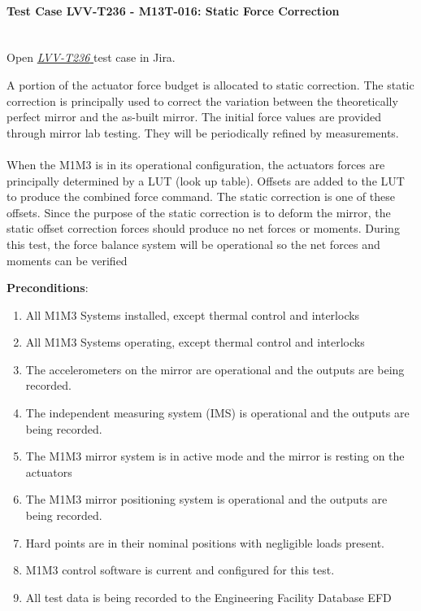 \documentclass[SE,lsstdraft,STR,toc]{lsstdoc}
\providecommand{\tightlist}{
  \setlength{\itemsep}{0pt}\setlength{\parskip}{0pt}}
\begin{document}
\paragraph{Test Case LVV-T236 - M13T-016: Static Force Correction }\mbox{}\\

Open  \href{https://jira.lsstcorp.org/secure/Tests.jspa#/testCase/LVV-T236}{\textit{ LVV-T236 } }
test case in Jira.

A portion of the actuator force budget is allocated to static
correction. The static correction is principally used to correct the
variation between the theoretically perfect mirror and the as-built
mirror. The initial force values are provided through mirror lab
testing. They will be periodically refined by measurements.\\
\hspace*{0.333em}\\
When the M1M3 is in its operational configuration, the actuators forces
are principally determined by a LUT (look up table). Offsets are added
to the LUT to produce the combined force command. The static correction
is one of these offsets. Since the purpose of the static correction is
to deform the mirror, the static offset correction forces should produce
no net forces or moments. During this test, the force balance system
will be operational so the net forces and moments can be verified

\textbf{ Preconditions}:\\
\begin{enumerate}
\tightlist
\item
  All M1M3 Systems installed, except thermal control and interlocks
\item
  All M1M3 Systems operating, except thermal control and interlocks
\item
  The accelerometers on the mirror are operational and the outputs are
  being recorded.
\item
  The independent measuring system (IMS) is operational and the outputs
  are being recorded.
\item
  The M1M3 mirror system is in active mode and the mirror is resting on
  the actuators
\item
  The M1M3 mirror positioning system is operational and the outputs are
  being recorded.
\item
  Hard points are in their nominal positions with negligible loads
  present.
\item
  M1M3 control software is current and configured for this test.
\item
  All test data is being recorded to the Engineering Facility Database
  EFD
\end{enumerate}
\end{document}
